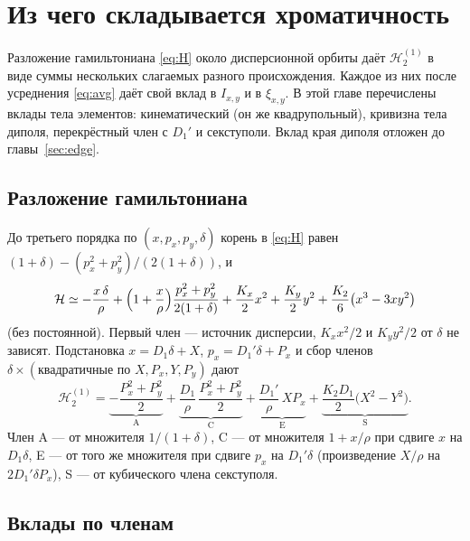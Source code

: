 \section{Из чего складывается хроматичность}
\label{sec:terms}

Разложение гамильтониана \eqref{eq:H} около дисперсионной орбиты даёт $\mathcal{H}_2^{(1)}$ в виде суммы нескольких слагаемых разного происхождения. Каждое из них после усреднения \eqref{eq:avg} даёт свой вклад в $I_{x,y}$ и в $\xi_{x,y}$. В этой главе перечислены вклады тела элементов: кинематический (он же квадрупольный), кривизна тела диполя, перекрёстный член с $D_1'$ и секступоли. Вклад края диполя отложен до главы~\ref{sec:edge}.

\subsection{Разложение гамильтониана}

До третьего порядка по $(x,p_x,p_y,\delta)$ корень в \eqref{eq:H} равен $(1+\delta)-(p_x^2+p_y^2)/(2(1+\delta))$, и
\begin{equation}
\label{eq:H3}
\mathcal{H}\simeq
-\frac{x\,\delta}{\rho}
+\Bigl(1+\frac{x}{\rho}\Bigr)\frac{p_x^2+p_y^2}{2(1+\delta)}
+\frac{K_x}{2}x^2+\frac{K_y}{2}y^2
+\frac{K_2}{6}\bigl(x^3-3xy^2\bigr)
\end{equation}
(без постоянной). Первый член --- источник дисперсии, $K_xx^2/2$ и $K_yy^2/2$ от $\delta$ не зависят. Подстановка $x=D_1\delta+X$, $p_x=D_1'\delta+P_x$ и сбор членов $\delta\times(\text{квадратичные по }X,P_x,Y,P_y)$ дают
\begin{equation}
\label{eq:H21}
\mathcal{H}_2^{(1)}
=\underbrace{-\frac{P_x^2+P_y^2}{2}}_{\mathrm{A}}
+\underbrace{\frac{D_1}{\rho}\,\frac{P_x^2+P_y^2}{2}}_{\mathrm{C}}
+\underbrace{\frac{D_1'}{\rho}\,X P_x}_{\mathrm{E}}
+\underbrace{\frac{K_2D_1}{2}\bigl(X^2-Y^2\bigr)}_{\mathrm{S}}.
\end{equation}
Член A --- от множителя $1/(1+\delta)$, C --- от множителя $1+x/\rho$ при сдвиге $x$ на $D_1\delta$, E --- от того же множителя при сдвиге $p_x$ на $D_1'\delta$ (произведение $X/\rho$ на $2D_1'\delta P_x$), S --- от кубического члена секступоля.

\subsection{Вклады по членам}


